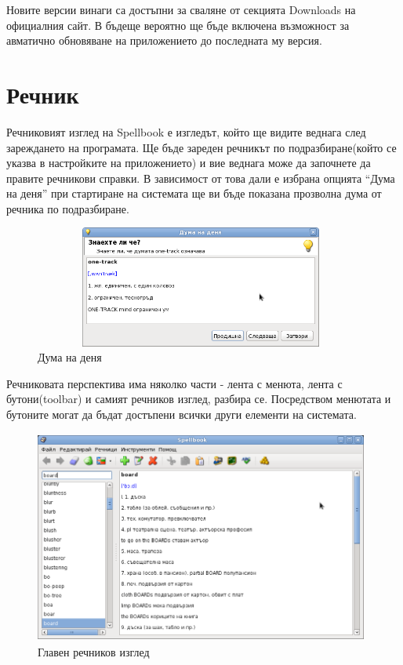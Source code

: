 Новите версии винаги са достъпни за сваляне от секцията Downloads на
официалния сайт. В бъдеще вероятно ще бъде включена възможност за
авматично обновяване на приложението до последната му версия.
\section{Речник}
Речниковият изглед на Spellbook е изгледът, който ще видите веднага
след зареждането на програмата. Ще бъде зареден речникът по
подразбиране(който се указва в настройките на приложението) и вие
веднага може да започнете да правите речникови справки. В зависимост
от това дали е избрана опцията "`Дума на деня"' при стартиране на
системата ще ви бъде показана прозволна дума от речника по подразбиране.
\begin{figure}[htbp]
  \caption{Дума на деня}
  \centering
  \includegraphics[width=110mm, height=40mm]{images/word_of_the_day.png}
\end{figure}

Речниковата перспектива има няколко части - лента с менюта, лента с
бутони(toolbar) и самият речников изглед, разбира се. Посредством
менютата и бутоните могат да бъдат достъпени всички други елементи на системата.
\begin{figure}[htbp]
  \caption{Главен речников изглед}
  \centering
  \includegraphics[width=110mm, height=70mm]{images/dictionary_view.png}
\end{figure}


